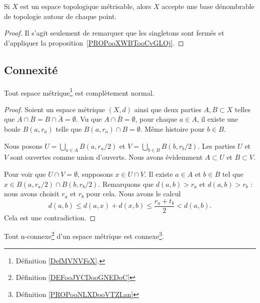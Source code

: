 \begin{corollary}       \label{CORooTWFYooCNMieM}
	Si \( X\) est un espace topologique métrisable, alors \( X\) accepte une base dénombrable de topologie autour de chaque point.
\end{corollary}

\begin{proof}
	Il s'agit seulement de remarquer que les singletons sont fermés et d'appliquer la proposition~\ref{PROPooXWBTooCvGLOj}.
\end{proof}

\subsection{Connexité}


\begin{proposition}	\label{PROPooUQNTooAegKwA}
	Tout espace métrique\footnote{Définition \ref{DefMVNVFsX}.} est complètement normal.
\end{proposition}

\begin{proof}
	Soient un espace métrique \( (X,d)\) ainsi que deux parties \( A,B\subset X\) telles que \( A\cap \bar B=B\cap\bar A=\emptyset\). Vu que \( A\cap \bar B=\emptyset\), pour chaque \( a\in A\), il existe une boule \( B(a,r_a)\) telle que \( B(a,r_a)\cap B=\emptyset\). Même histoire pour \( b\in B\).

	Nous posons \( U=\bigcup_{a\in A}B(a,r_a/2)\) et \( V=\bigcup_{b\in B}B(b,r_b/2)\). Les parties \( U\) et \( V\) sont ouvertes comme union d'ouverts. Nous avons évidemment \( A\subset U\) et \( B\subset V\).

	Pour voir que \( U\cap V=\emptyset\), supposons \( x\in U\cap V\). Il existe \( a\in A\) et \( b\in B\) tel que \( x\in B(a,r_a/2)\cap B(b,r_b/2)\). Remarquons que \( d(a,b)>r_a\) et \( d(a,b)>r_b\) : nous avons choisit \( r_a\) et \( r_b\) pour cela. Nous avons le calcul
	\begin{equation}
		d(a,b)  \leq d(a,x)+d(x,b)
		\leq \frac{ r_a+t_b }{2}
		<d(a,b).
	\end{equation}
	Cela est une contradiction.
\end{proof}

\begin{proposition}	\label{PROPooBMFBooIQJMNC}
	Tout n-connexe\footnote{Définition \ref{DEFooJYCDooGNEDoC}} d'un espace métrique est connexe\footnote{Définition \ref{PROPooNLXDooVTZLan}}.
\end{proposition}

